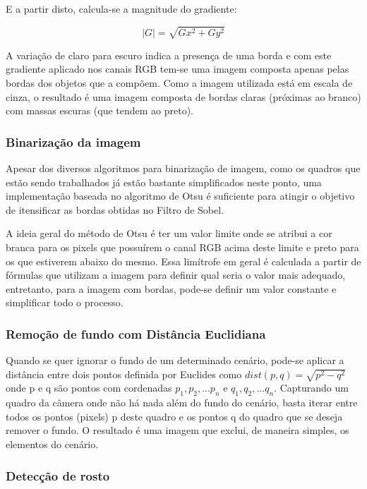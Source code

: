 \documentclass[a4paper]{article}
\begin{document}
E a partir disto, calcula-se a magnitude do gradiente:

$$
|G|=\sqrt{Gx^2 + Gy^2}
$$  

A variação de claro para escuro indica a presença de uma borda e com este gradiente aplicado nos canais RGB tem-se uma imagem composta apenas pelas bordas dos objetos que a compõem. Como a imagem utilizada está em escala de cinza, o resultado é uma imagem composta de bordas claras (próximas ao branco) com massas escuras (que tendem ao preto).

\subsubsection{Binarização da imagem}

Apesar dos diversos algoritmos para binarização de imagem, como os quadros que estão sendo trabalhados já estão bastante simplificados neste ponto, uma implementação baseada no algoritmo de Otsu é suficiente para atingir o objetivo de itensificar as bordas obtidas no Filtro de Sobel.

A ideia geral do método de Otsu é ter um valor limite onde se atribui a cor branca para os pixels que possuírem o canal RGB acima deste limite e preto para os que estiverem abaixo do mesmo. Essa limítrofe em geral é calculada a partir de fórmulas que utilizam a imagem para definir qual seria o valor mais adequado, entretanto, para a imagem com bordas, pode-se definir um valor constante e simplificar todo o processo.

\subsubsection{Remoção de fundo com Distância Euclidiana}

Quando se quer ignorar o fundo de um determinado cenário, pode-se aplicar a distância entre dois pontos definida por Euclides como $dist(p, q) = \sqrt{p^2 - q^2}$ onde p e q são pontos com cordenadas $p_{1}, p_{2}, ... p_{n}$ e $q_{1}, q_{2}, ... q_{n}$. Capturando um quadro da câmera onde não há nada além do fundo do cenário, basta iterar entre todos os pontos (pixels) p deste quadro e os pontos q do quadro que se deseja remover o fundo. O resultado é uma imagem que exclui, de maneira simples, os elementos do cenário.

\subsubsection{Detecção de rosto}
\end{document}
